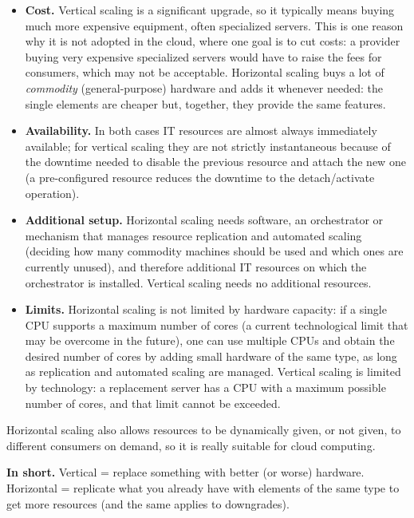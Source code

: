  \begin{itemize}
 	\item \textbf{Cost.} Vertical scaling is a significant upgrade, so it typically means buying much more expensive equipment, often specialized servers. This is one reason why it is not adopted in the cloud, where one goal is to cut costs: a provider buying very expensive specialized servers would have to raise the fees for consumers, which may not be acceptable. Horizontal scaling buys a lot of \emph{commodity} (general-purpose) hardware and adds it whenever needed: the single elements are cheaper but, together, they provide the same features.
 	\item \textbf{Availability.} In both cases IT resources are almost always immediately available; for vertical scaling they are not strictly instantaneous because of the downtime needed to disable the previous resource and attach the new one (a pre-configured resource reduces the downtime to the detach/activate operation).
 	\item \textbf{Additional setup.} Horizontal scaling needs software, an orchestrator or mechanism that manages resource replication and automated scaling (deciding how many commodity machines should be used and which ones are currently unused), and therefore additional IT resources on which the orchestrator is installed. Vertical scaling needs no additional resources.
 	\item \textbf{Limits.} Horizontal scaling is not limited by hardware capacity: if a single CPU supports a maximum number of cores (a current technological limit that may be overcome in the future), one can use multiple CPUs and obtain the desired number of cores by adding small hardware of the same type, as long as replication and automated scaling are managed. Vertical scaling is limited by technology: a replacement server has a CPU with a maximum possible number of cores, and that limit cannot be exceeded.
 \end{itemize}
 
 Horizontal scaling also allows resources to be dynamically given, or not given, to different consumers on demand, so it is really suitable for cloud computing.
 
 \begin{notebox}
 	\textbf{In short.} Vertical = replace something with better (or worse) hardware. Horizontal = replicate what you already have with elements of the same type to get more resources (and the same applies to downgrades).
 \end{notebox}

